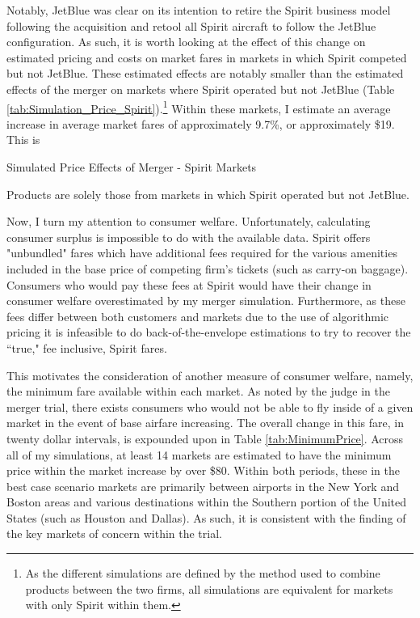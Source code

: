 \documentclass{article}
\begin{document}
    Notably, JetBlue was clear on its intention to retire the Spirit business model following the acquisition and retool all Spirit aircraft to follow the JetBlue configuration. As such, it is worth looking at the effect of this change on estimated pricing and costs on market fares in markets in which Spirit competed but not JetBlue. These estimated effects are notably smaller than the estimated effects of the merger on markets where Spirit operated but not JetBlue (Table \ref{tab:Simulation_Price_Spirit}).\footnote{As the different simulations are defined by the method used to combine products between the two firms, all simulations are equivalent for markets with only Spirit within them.} Within these markets, I estimate an average increase in average market fares of approximately 9.7\%, or approximately \$19. This is 

    \begin{table}
        \caption{Simulated Price Effects of Merger - Spirit Markets}
        \label{tab:Simulation_Price_Spirit}
                        \vspace{-15mm}
        \begin{center}
              
              \footnotesize{Products are solely those from markets in which Spirit operated but not JetBlue.}
        \end{center}
    \end{table}


     Now, I turn my attention to consumer welfare. Unfortunately, calculating consumer surplus is impossible to do with the available data. Spirit offers "unbundled" fares which have additional fees required for the various amenities included in the base price of competing firm's tickets (such as carry-on baggage). Consumers who would pay these fees at Spirit would have their change in consumer welfare overestimated by my merger simulation. Furthermore, as these fees differ between both customers and markets due to the use of algorithmic pricing \citep{senate_permanent_committee_on_investigations_majority_2024} it is infeasible to do back-of-the-envelope estimations to try to recover the ``true," fee inclusive, Spirit fares. 
     
     This motivates the consideration of another measure of consumer welfare, namely, the minimum fare available within each market. As noted by the judge in the merger trial, there exists consumers who would not be able to fly inside of a given market in the event of base airfare increasing. The overall change in this fare, in twenty dollar intervals, is expounded upon in Table \ref{tab:MinimumPrice}. Across all of my simulations, at least 14 markets are estimated to have the minimum price within the market increase by over \$80. Within both periods, these in the best case scenario markets are primarily between airports in the New York and Boston areas and various destinations within the Southern portion of the United States (such as Houston and Dallas). As such, it is consistent with the finding of the key markets of concern within the trial. 
\end{document}
